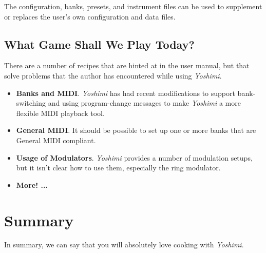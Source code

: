 \documentclass[
 11pt,
 twoside,
 a4paper,
 headinclude,
 footinclude,
 final                                 %
]{article}
\begin{document}
   The configuration, banks, presets, and instrument files can be used
   to supplement or replaces the user's own configuration and data files.

\subsection{What Game Shall We Play Today?}
\label{subsec:introduction_what_game}

   There are a number of recipes that are hinted at in the user manual, but
   that solve problems that the author has encountered while using
   \textsl{Yoshimi}.

   \begin{itemize}
      \item \textbf{Banks and MIDI}.
         \textsl{Yoshimi} has had recent modifications to support
         bank-switching and using program-change messages to make
         \textsl{Yoshimi} a more flexible MIDI playback tool.
      \item \textbf{General MIDI}.
         It should be possible to set up one or more banks that
         are General MIDI compliant.
      \item \textbf{Usage of Modulators}.
         \textsl{Yoshimi} provides a number of modulation setups,
         but it isn't clear how to use them, especially the ring modulator.
      \item \textbf{More! ...}
   \end{itemize}







% 

\section{Summary}
\label{sec:summary}

   In summary, we can say that you will absolutely love 
   cooking with \textsl{Yoshimi}.




\printindex
\end{document}

